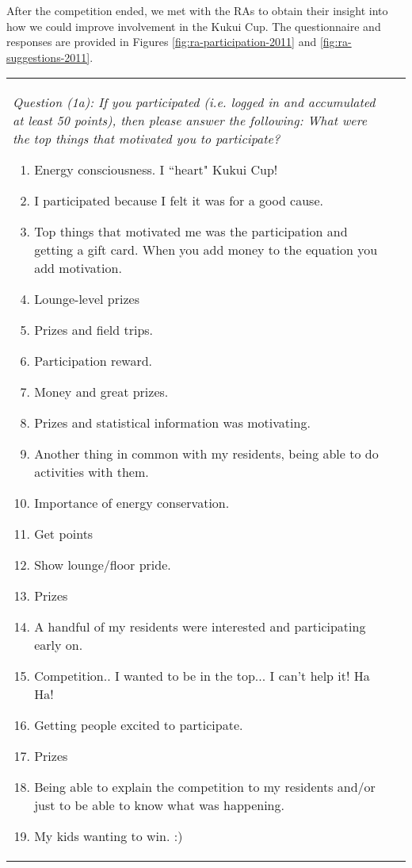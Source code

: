 \documentclass[]{article}
\begin{document}
After the competition ended, we met with the RAs to obtain their insight into how we could
improve involvement in the Kukui Cup.   The questionnaire and responses are provided in
Figures \ref{fig:ra-participation-2011} and \ref{fig:ra-suggestions-2011}.

\begin{figure*}[t]
\begin{tabular}{|l|l|}
\hline

\small  \begin{minipage}[t]{3in}
{\em Question  (1a):  If you participated (i.e. logged in and accumulated at least 50 points), then please answer the 
following:  What were the top things that motivated you to participate?}
\begin{enumerate}
\item Energy consciousness.  I ``heart" Kukui Cup!
\item I participated because I felt it was for a good cause.
\item Top things that motivated me was the participation and getting a gift card.  When you add money to the equation you add motivation.
\item Lounge-level prizes
\item Prizes and field trips.
\item Participation reward.
\item Money and great prizes.
\item Prizes and statistical information was motivating.
\item Another thing in common with my residents, being able to do activities with them.
\item Importance of energy conservation. 
\item Get points
\item Show lounge/floor pride.
\item Prizes
\item A handful of my residents were interested and participating early on. 
\item Competition.. I wanted to be in the top... I can't help it!  Ha Ha!
\item Getting people excited to participate.  
\item Prizes
\item Being able to explain the competition to my residents and/or just to be able to know what was happening. 
\item My kids wanting to win. :)
\end{enumerate}
\end{minipage}  \normalsize


\end{tabular}
\end{figure*}
\end{document}
